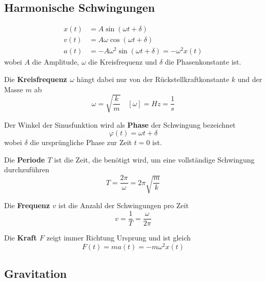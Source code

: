 \documentclass[7pt]{article}
\begin{document}
\begin{multicols*}{3}
\subsection{Harmonische Schwingungen}

\begin{equation*}
\begin{split}
	x(t) & = A\sin(\omega t+\delta)\\
	v(t) & = A\omega\cos(\omega t + \delta)\\
	a(t) & = -A\omega^2\sin(\omega t+\delta) = -\omega^2x(t)
\end{split}
\end{equation*}
wobei $A$ die Amplitude, $\omega$ die Kreisfrequenz und $\delta$ die Phasenkonstante ist.
\newline

Die \textbf{Kreisfrequenz $\omega$} h{\"a}ngt dabei nur von der R{\"u}ckstellkraftkonstante $k$ und der Masse $m$ ab
\begin{equation*}
	\omega = \sqrt{\frac{k}{m}} \quad [\omega] = Hz = \frac{1}{s}
\end{equation*}

Der Winkel der Sinusfunktion wird als \textbf{Phase} der Schwingung bezeichnet
\begin{equation*}
	\varphi(t) = \omega t + \delta
\end{equation*}
wobei $\delta$ die urspr{\"u}ngliche Phase zur Zeit $t = 0$ ist. \newline

Die \textbf{Periode $T$} ist die Zeit, die ben{\"o}tigt wird, um eine vollst{\"a}ndige Schwingung durchzuf{\"u}hren
\begin{equation*}
	T = \frac{2\pi}{\omega} = 2\pi\sqrt{\frac{m}{k}}
\end{equation*} 

Die \textbf{Frequenz $v$} ist die Anzahl der Schwingungen pro Zeit
\begin{equation*}
	v = \frac{1}{T} = \frac{\omega}{2\pi}
\end{equation*}

Die \textbf{Kraft $F$} zeigt immer Richtung Ursprung und ist gleich
\begin{equation*}
	F(t) = ma(t) = -m\omega^2x(t)
\end{equation*}

\subsection{Gravitation}


\end{multicols*}
\end{document}
